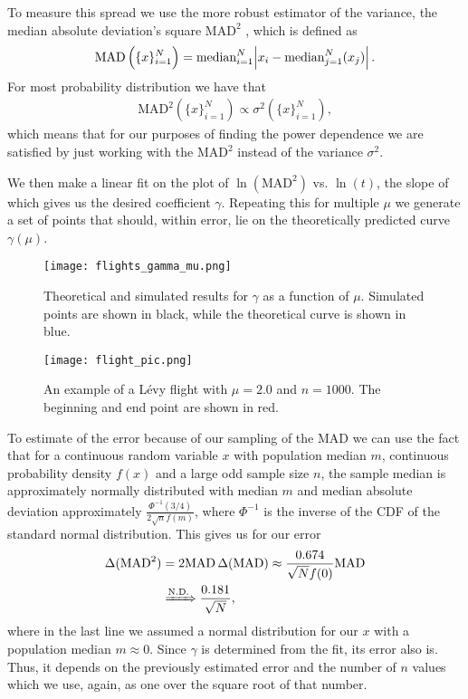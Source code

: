 \documentclass[10pt,a4paper,twocolumn]{article}
\newcommand{\MAD}{\mathrm{MAD}}
\begin{document}
To measure this spread we use the more robust estimator of the variance, the median absolute deviation's square $\MAD^2$ \cite{mad}, which is defined as
%
\begin{align}
\MAD \left( \{x\}_{i=1}^{N} \right) = \mathrm{median}_{i=1}^{N} \abs{x_i - \mathrm{median}_{j=1}^{N}(x_j)}.
\end{align}
%
For most probability distribution we have that
%
\begin{align}
\MAD^2 \left( \{x\}_{i=1}^{N} \right) \propto \sigma^2 \left( \{x\}_{i=1}^{N} \right),
\end{align}
%
which means that for our purposes of finding the power dependence we are satisfied by just working with the $\MAD^2$ instead of the variance $\sigma^2$.

We then make a linear fit on the plot of $\ln(\MAD^2)$ vs. $\ln(t)$, the slope of which gives us the desired coefficient $\gamma$. Repeating this for multiple $\mu$ we generate a set of points that should, within error, lie on the theoretically predicted curve $\gamma(\mu)$.

\begin{figure}[h]
\centering
\captionsetup{justification=centering}
\texttt{[image: flights\_gamma\_mu.png]}
\caption{Theoretical and simulated results for $\gamma$ as a function of $\mu$. Simulated points are shown in black, while the theoretical curve is shown in blue.}
\label{fig:flights_gamma_mu}
\end{figure}

\begin{figure}[h]
\centering
\captionsetup{justification=centering}
\texttt{[image: flight\_pic.png]}
\caption{An example of a L\'evy flight with $\mu = 2.0 $ and $n = 1000$. The beginning and end point are shown in red.}
\label{fig:flight_pic}
\end{figure}

To estimate of the error because of our sampling of the $\MAD$ we can use the fact \cite{mad_err} that for a continuous random variable $x$ with population median $m$, continuous probability density $f(x)$ and a large odd sample size $n$, the sample median is approximately normally distributed with median $m$ and median absolute deviation approximately $\frac{\Phi^{-1}(3/4)}{2 \sqrt{n} f(m)}$, where $\Phi^{-1}$ is the inverse of the CDF of the standard normal distribution. This gives us for our error
%
\begin{align}
\Delta(\MAD^2) &= 2 \MAD \, \Delta(\MAD) \approx \frac{0.674}{\sqrt{N} f(0)} \MAD \notag\\ &\xRightarrow{\mathrm{N. D.}} \frac{0.181}{\sqrt{N}},
\end{align} 
%
where in the last line we assumed a normal distribution for our $x$ with a population median $m \approx 0$. Since $\gamma$ is determined from the fit, its error also is. Thus, it depends on the previously estimated error and the number of $n$ values which we use, again, as one over the square root of that number. 
\end{document}
